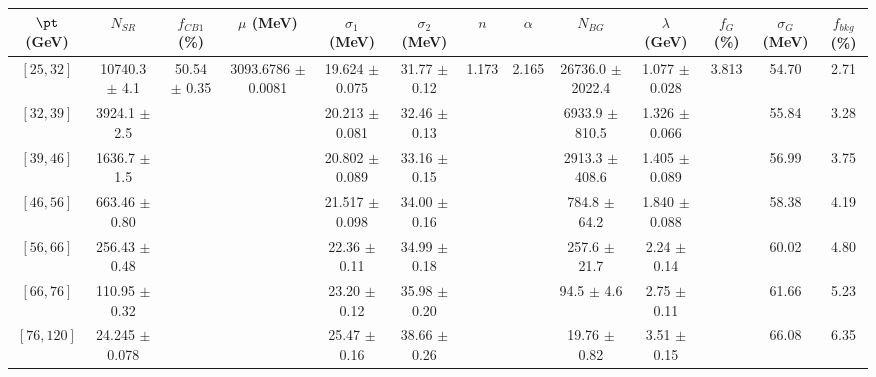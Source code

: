 \begin{tabular}{c||c|c|c|c|c|c|c|c|c|c|c||c}
$\pt$ (GeV) & $N_{SR}$ & $f_{CB1}$ (\%) & $\mu$ (MeV) & $\sigma_1$ (MeV) & $\sigma_2$ (MeV) & $n$ & $\alpha$ & $N_{BG}$ & $\lambda$ (GeV) & $f_G$ (\%) & $\sigma_G$ (MeV) & $f_{bkg}$ (\%) \\
\hline
$[25, 32]$ & 10740.3 $\pm$ 4.1 & \multirow{7}{*}{50.54 $\pm$ 0.35} & \multirow{7}{*}{3093.6786 $\pm$ 0.0081} & 19.624 $\pm$ 0.075 & 31.77 $\pm$ 0.12 & \multirow{7}{*}{1.173} & \multirow{7}{*}{2.165} & 26736.0 $\pm$ 2022.4 & 1.077 $\pm$ 0.028 & \multirow{7}{*}{3.813} & 54.70 & 2.71\\
$[32, 39]$ & 3924.1 $\pm$ 2.5 &  &  & 20.213 $\pm$ 0.081 & 32.46 $\pm$ 0.13 &  &  & 6933.9 $\pm$ 810.5 & 1.326 $\pm$ 0.066 &  & 55.84 & 3.28\\
$[39, 46]$ & 1636.7 $\pm$ 1.5 &  &  & 20.802 $\pm$ 0.089 & 33.16 $\pm$ 0.15 &  &  & 2913.3 $\pm$ 408.6 & 1.405 $\pm$ 0.089 &  & 56.99 & 3.75\\
$[46, 56]$ & 663.46 $\pm$ 0.80 &  &  & 21.517 $\pm$ 0.098 & 34.00 $\pm$ 0.16 &  &  & 784.8 $\pm$ 64.2 & 1.840 $\pm$ 0.088 &  & 58.38 & 4.19\\
$[56, 66]$ & 256.43 $\pm$ 0.48 &  &  & 22.36 $\pm$ 0.11 & 34.99 $\pm$ 0.18 &  &  & 257.6 $\pm$ 21.7 & 2.24 $\pm$ 0.14 &  & 60.02 & 4.80\\
$[66, 76]$ & 110.95 $\pm$ 0.32 &  &  & 23.20 $\pm$ 0.12 & 35.98 $\pm$ 0.20 &  &  & 94.5 $\pm$ 4.6 & 2.75 $\pm$ 0.11 &  & 61.66 & 5.23\\
$[76, 120]$ & 24.245 $\pm$ 0.078 &  &  & 25.47 $\pm$ 0.16 & 38.66 $\pm$ 0.26 &  &  & 19.76 $\pm$ 0.82 & 3.51 $\pm$ 0.15 &  & 66.08 & 6.35\\
\end{tabular}
